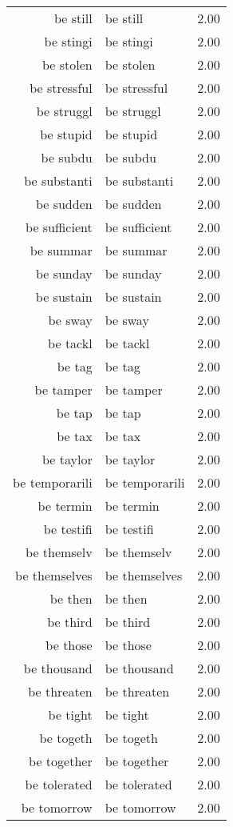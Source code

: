 \begin{table}[ht]
\begin{tabular}{rlr}
  be still & be still & 2.00 \\ 
  be stingi & be stingi & 2.00 \\ 
  be stolen & be stolen & 2.00 \\ 
  be stressful & be stressful & 2.00 \\ 
  be struggl & be struggl & 2.00 \\ 
  be stupid & be stupid & 2.00 \\ 
  be subdu & be subdu & 2.00 \\ 
  be substanti & be substanti & 2.00 \\ 
  be sudden & be sudden & 2.00 \\ 
  be sufficient & be sufficient & 2.00 \\ 
  be summar & be summar & 2.00 \\ 
  be sunday & be sunday & 2.00 \\ 
  be sustain & be sustain & 2.00 \\ 
  be sway & be sway & 2.00 \\ 
  be tackl & be tackl & 2.00 \\ 
  be tag & be tag & 2.00 \\ 
  be tamper & be tamper & 2.00 \\ 
  be tap & be tap & 2.00 \\ 
  be tax & be tax & 2.00 \\ 
  be taylor & be taylor & 2.00 \\ 
  be temporarili & be temporarili & 2.00 \\ 
  be termin & be termin & 2.00 \\ 
  be testifi & be testifi & 2.00 \\ 
  be themselv & be themselv & 2.00 \\ 
  be themselves & be themselves & 2.00 \\ 
  be then & be then & 2.00 \\ 
  be third & be third & 2.00 \\ 
  be those & be those & 2.00 \\ 
  be thousand & be thousand & 2.00 \\ 
  be threaten & be threaten & 2.00 \\ 
  be tight & be tight & 2.00 \\ 
  be togeth & be togeth & 2.00 \\ 
  be together & be together & 2.00 \\ 
  be tolerated & be tolerated & 2.00 \\ 
  be tomorrow & be tomorrow & 2.00 \\ 

\end{tabular}
\end{table}
